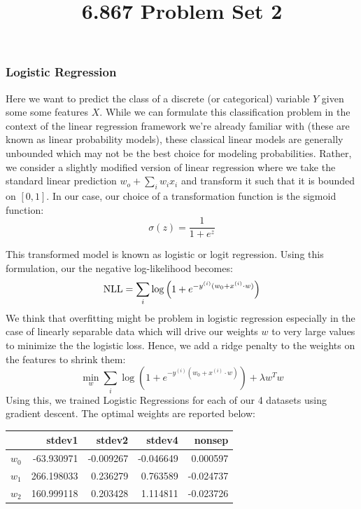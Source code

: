 \documentclass[10pt]{article}
\begin{document}
	\title{6.867 Problem Set 2}
	\maketitle


\subsubsection*{Logistic Regression}
Here we want to predict the class of a discrete (or categorical) variable $Y$ given some some features $X$. While we can formulate this classification problem in the context of the linear regression framework we're already familiar with (these are known as linear probability models), these classical linear models are generally unbounded which may not be the best choice for modeling probabilities. Rather, we consider a slightly modified version of linear regression where we take the standard linear prediction $w_o + \sum_i w_i x_i$ and transform it such that it is bounded on $[0,1]$. In our case, our choice of a transformation function is the sigmoid function:
\begin{equation*}
	\sigma(z) = \frac{1}{1+e^{z}}
\end{equation*}

This transformed model is known as logistic or logit regression. Using this formulation, our the negative log-likelihood becomes:
\begin{equation*}
	\textnormal{NLL}=\sum_i \log \left(1+e^{-y^{(i)}(w_0 + x^{(i)}\cdot w)} \right)
\end{equation*}
We think that overfitting might be problem in logistic regression especially in the case of linearly separable data which will drive our weights $w$ to very large values to minimize the the logistic loss. Hence, we add a ridge penalty to the weights on the features to shrink them:
\begin{equation*}
	\min_w \sum_i \log \left(1+e^{-y^{(i)}(w_0 + x^{(i)}\cdot w)} \right) + \lambda w^T w
\end{equation*}
Using this, we trained Logistic Regressions for each of our 4 datasets using gradient descent. The optimal weights are reported below:

\begin{table}[ht]
\centering
{}
\begin{tabular}{lrrrr}
\toprule
{}    &      stdev1 &    stdev2 &    stdev4 & nonsep\\
\midrule
$w_0$ &  -63.930971 & -0.009267 & -0.046649 & 0.000597\\
$w_1$ &  266.198033 &  0.236279 &  0.763589 & -0.024737\\
$w_2$ &  160.999118 &  0.203428 &  1.114811 & -0.023726\\
\bottomrule
\end{tabular}
\end{table}
\end{document}

